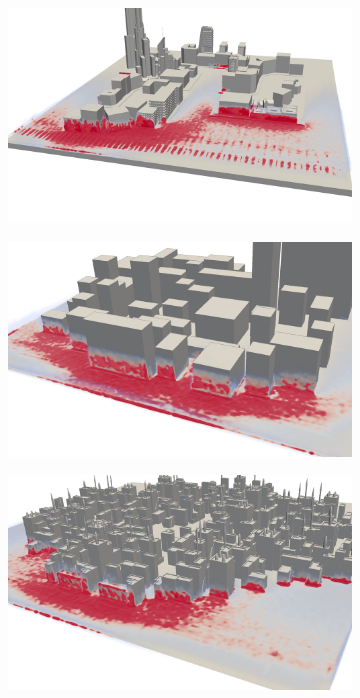 \begin{figure}[h]
  \begin{subfigure}{.5\textwidth}
    \centering
    \includegraphics[width=\textwidth]{figures/impulse-heatmap-0.png}
  \end{subfigure}
  \begin{subfigure}{.5\textwidth}
    \centering
    \includegraphics[width=\textwidth]{figures/impulse-heatmap-1.png}
  \end{subfigure}
  \begin{subfigure}{\textwidth}
    \centering
    \includegraphics[width=\textwidth]{figures/impulse-heatmap-2.png}

\end{subfigure}
\end{figure}
